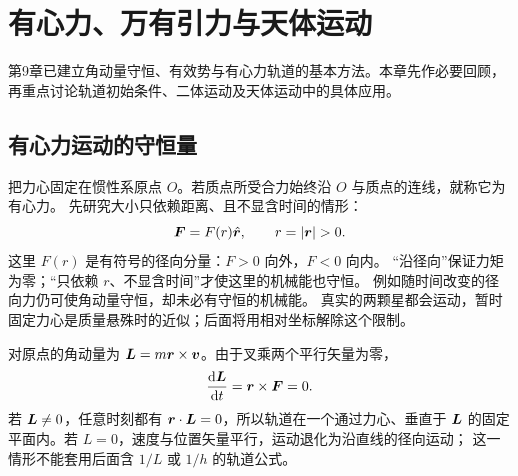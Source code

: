 \hypersetup{bookmarksdepth=3}
\begingroup
\renewcommand{\Needspace}[1]{\par\begingroup
\dimen0=#1\relax\vskip0pt plus\dimen0\penalty-100
\vskip0pt plus-\dimen0\vskip\dimen0\penalty9999\vskip-\dimen0
\vskip0pt\endgroup}
\chapter{有心力、万有引力与天体运动}



第9章已建立角动量守恒、有效势与有心力轨道的基本方法。本章先作必要回顾，再重点讨论轨道初始条件、二体运动及天体运动中的具体应用。

\section{有心力运动的守恒量}
\label{ch11:sec:central}

把力心固定在惯性系原点 $O$。若质点所受合力始终沿 $O$ 与质点的连线，就称它为有心力。
先研究大小只依赖距离、且不显含时间的情形：
\begin{equation}\label{ch11:eq:central-force}
 \vect F=F(r)\uvec r,\qquad r=|\vect r|>0.
\end{equation}
这里 $F(r)$ 是有符号的径向分量：$F>0$ 向外，$F<0$ 向内。
“沿径向”保证力矩为零；“只依赖 $r$、不显含时间”才使这里的机械能也守恒。
例如随时间改变的径向力仍可使角动量守恒，却未必有守恒的机械能。
真实的两颗星都会运动，暂时固定力心是质量悬殊时的近似；后面将用相对坐标解除这个限制。

对原点的角动量为 $\bm{L}=m\bm{r}\times\bm{v}$。由于叉乘两个平行矢量为零，
\begin{equation}
 \frac{\mathop{}\!\mathrm d\bm{L}}{\mathop{}\!\mathrm d t}=\bm{r}\times\bm{F}=0.
\end{equation}
若 $\bm{L}\ne0$，任意时刻都有 $\bm{r}\cdot\bm{L}=0$，所以轨道在一个通过力心、垂直于
$\bm{L}$ 的固定平面内。若 $L=0$，速度与位置矢量平行，运动退化为沿直线的径向运动；
这一情形不能套用后面含 $1/L$ 或 $1/h$ 的轨道公式。

